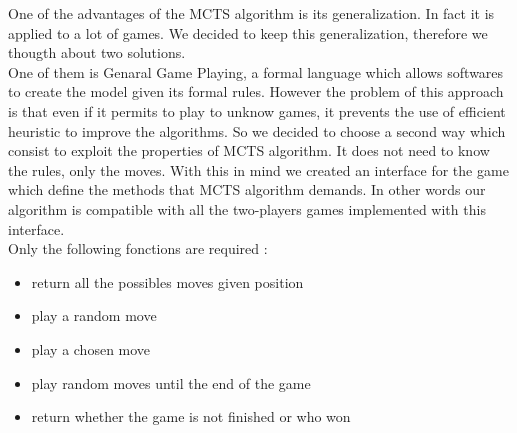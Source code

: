 


% 
One of the advantages of the MCTS algorithm is its generalization. In fact it is applied to a lot of games. We decided to keep this generalization, therefore we thougth about two solutions.
\bigskip\\
One of them is Genaral Game Playing, a formal language which allows softwares to create the model given its formal rules. However the problem of this approach is that even if it permits to play to unknow games, it prevents the use of efficient heuristic to improve the algorithms.
So we decided to choose a second way which consist to exploit the properties of MCTS algorithm. 
It does not need to know the rules, only the moves. With this in mind we created an interface for the game which define the methods that MCTS algorithm demands. In other words our algorithm is compatible with all the two-players games implemented with this interface.
\bigskip\\
Only the following fonctions are required : 
\begin{itemize}
\item return all the possibles moves given position
\item play a random move
\item play a chosen move 
\item play random moves until the end of the game
\item return whether the game is not finished or who won
\end{itemize}
